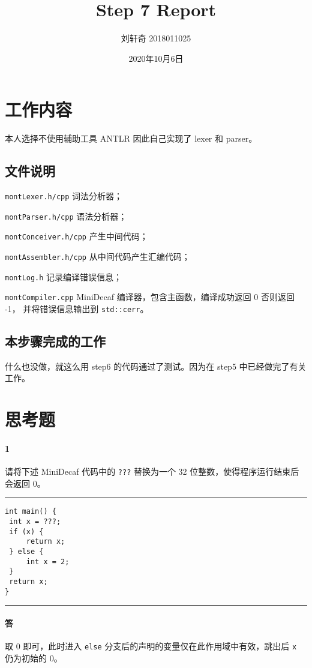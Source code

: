 \documentclass[UTF8]{ctexart}
\title{Step 7 Report}
\author{刘轩奇 2018011025}
\date{2020年10月6日}
\newcommand{\T}[1]{\texttt{{#1}}}
\begin{document}
    \maketitle
    \section{工作内容}
        本人选择不使用辅助工具 ANTLR 因此自己实现了 lexer 和 parser。
        \subsection{文件说明} 
            \T{montLexer.h/cpp} 词法分析器；

            \T{montParser.h/cpp} 语法分析器；

            \T{montConceiver.h/cpp} 产生中间代码；

            \T{montAssembler.h/cpp} 从中间代码产生汇编代码；
            
            \T{montLog.h} 记录编译错误信息；

            \T{montCompiler.cpp} MiniDecaf 编译器，包含主函数，编译成功返回 0 否则返回 -1，
            并将错误信息输出到 \T{std::cerr}。
        
        \subsection{本步骤完成的工作}

            什么也没做，就这么用 step6 的代码通过了测试。因为在 step5 中已经做完了有关工作。
        
    \section{思考题}
        \paragraph{1} 请将下述 MiniDecaf 代码中的 \T{???} 替换为一个 32 位整数，使得程序运行结束后会返回 0。
        
        \noindent\rule{\textwidth}{1pt}
        \begin{lstlisting}[style=lfonts]
int main() {
 int x = ???;
 if (x) {
     return x;
 } else {
     int x = 2;
 }
 return x;
}
        \end{lstlisting}
        \noindent\rule{\textwidth}{1pt}

        \paragraph{答} 取 0 即可，此时进入 \T{else} 分支后的声明的变量仅在此作用域中有效，跳出后 \T{x} 仍为初始的 0。
\end{document}
